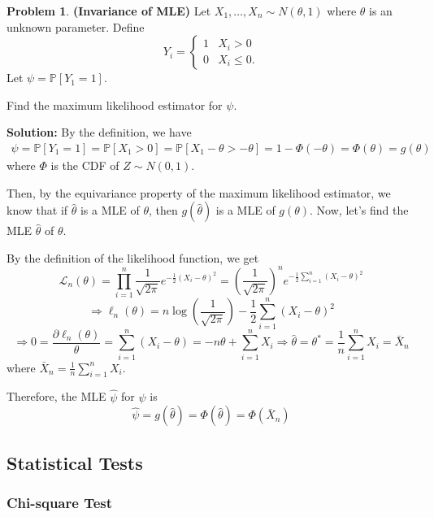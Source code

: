 \documentclass[13pt]{article}
\theoremstyle{definition}
\newtheorem{problem}[theorem]{Problem}
\newenvironment{solution}
{\color{C2}\begin{framed}\begingroup\textbf{Solution:} }
  {\endgroup\end{framed}}
\theoremstyle{remark}
\newcommand{\PP}{\mathbb{P}}
\begin{document}
\newpage
\begin{problem}\textbf{(Invariance of MLE)}
    Let $X_1, \ldots, X_n \sim N(\theta,1)$ where $\theta$ is an unknown parameter.
    Define
    \begin{equation*}
        Y_i = \begin{cases}1 & X_i > 0 \\ 0 & X_i \leq 0. \end{cases}
    \end{equation*}
    Let $\psi = \PP[Y_1 = 1]$.

    Find the maximum likelihood estimator for $\psi$.
\end{problem}

\begin{solution}
By the definition, we have
\begin{align*}
\psi = \PP[Y_1= 1] = \PP[X_1>0] =\PP[X_1-\theta>-\theta]= 1-\Phi(-\theta) = \Phi(\theta)  = g(\theta)
\end{align*}
where $\Phi$ is the CDF of $Z\sim N(0,1)$.

Then, by the equivariance property of the maximum likelihood estimator, we know that if $\hat{\theta}$ is a MLE of $\theta$, then $g(\hat{\theta})$ is a MLE of $g(\theta)$. Now, let's find the MLE $\hat{\theta}$
of $\theta$.

By the definition of the likelihood function, we get
\[
\mathcal{L}_n(\theta) = \prod_{i=1}^n  \frac{1}{\sqrt{2\pi}}e^{-\frac{1}{2}\left(X_i-\theta\right)^2} = \left(\frac{1}{\sqrt{2\pi}}\right)^n e^{-\frac{1}{2}\sum_{i=1}^n (X_i-\theta)^2}
\]
\[
\Longrightarrow \ell_n(\theta) = n\log\left(\frac{1}{\sqrt{2\pi}}\right)-\frac{1}{2}\sum_{i=1}^n (X_i-\theta)^2
\]
\[
\Longrightarrow 0=\frac{\partial \ell_n(\theta)}{\theta} = \sum_{i=1}^n (X_i-\theta) = -n\theta+\sum_{i=1}^n X_i \Longrightarrow \hat{\theta}=\theta^* = \frac{1}{n}\sum_{i=1}^n X_i = \bar{X}_n
\]
where $\bar{X}_n = \frac{1}{n}\sum_{i=1}^n X_i$.

Therefore, the MLE $\hat{\psi}$ for $\psi$ is 
\[
\hat{\psi} = g(\hat{\theta}) = \Phi(\hat{\theta}) = \Phi(\bar{X}_n)
\]
\end{solution}

\subsection{Statistical Tests}
\subsubsection{Chi-square Test}
\end{document}
